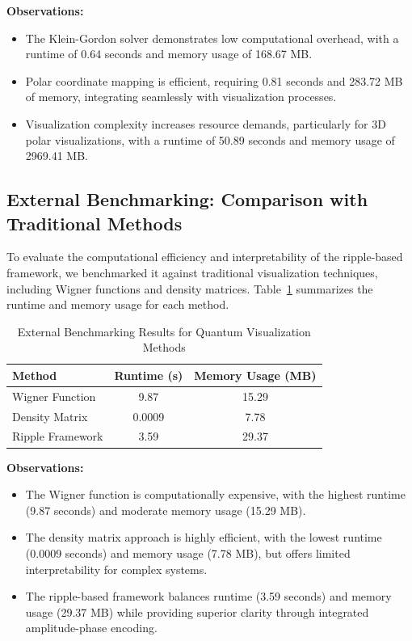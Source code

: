 \documentclass[12pt]{article}
\begin{document}
\textbf{Observations:}
\begin{itemize}
    \item The Klein-Gordon solver demonstrates low computational overhead, with a runtime of 0.64 seconds and memory usage of 168.67 MB.
    \item Polar coordinate mapping is efficient, requiring 0.81 seconds and 283.72 MB of memory, integrating seamlessly with visualization processes.
    \item Visualization complexity increases resource demands, particularly for 3D polar visualizations, with a runtime of 50.89 seconds and memory usage of 2969.41 MB.
\end{itemize}

\subsection{External Benchmarking: Comparison with Traditional Methods}

To evaluate the computational efficiency and interpretability of the ripple-based framework, we benchmarked it against traditional visualization techniques, including Wigner functions and density matrices. Table~\ref{tab:benchmark_methods} summarizes the runtime and memory usage for each method.

\begin{table}[H]
\centering
\caption{External Benchmarking Results for Quantum Visualization Methods}
\begin{tabular}{|l|c|c|}
    \hline
    \textbf{Method} & \textbf{Runtime (s)} & \textbf{Memory Usage (MB)} \\
    \hline
    Wigner Function & 9.87 & 15.29 \\
    Density Matrix & 0.0009 & 7.78 \\
    Ripple Framework & 3.59 & 29.37 \\
    \hline
\end{tabular}
\label{tab:benchmark_methods}
\end{table}

\textbf{Observations:}
\begin{itemize}
    \item The Wigner function is computationally expensive, with the highest runtime (9.87 seconds) and moderate memory usage (15.29 MB).
    \item The density matrix approach is highly efficient, with the lowest runtime (0.0009 seconds) and memory usage (7.78 MB), but offers limited interpretability for complex systems.
    \item The ripple-based framework balances runtime (3.59 seconds) and memory usage (29.37 MB) while providing superior clarity through integrated amplitude-phase encoding.
\end{itemize}
\end{document}
